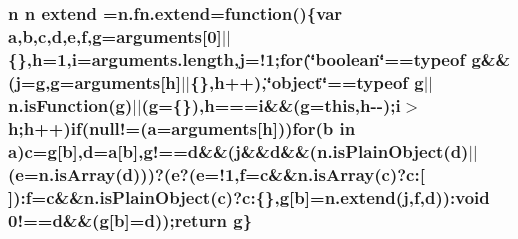 \subsubsection[{\texorpdfstring{extend}{extend}}]{\setlength{\rightskip}{0pt plus 5cm}n n extend =n.\+fn.\+extend=function()\{var {\bf a},{\bf b},{\bf c},{\bf d},{\bf e},{\bf f},{\bf g}=arguments\mbox{[}0\mbox{]}$\vert$$\vert$\{\},{\bf h}=1,{\bf i}={\bf arguments.\+length},{\bf j}=!1;{\bf for}(\char`\"{}boolean\char`\"{}==typeof {\bf g}\&\&({\bf j}={\bf g},{\bf g}=arguments\mbox{[}{\bf h}\mbox{]}$\vert$$\vert$\{\},{\bf h}++),\char`\"{}object\char`\"{}==typeof {\bf g}$\vert$$\vert${\bf n.\+is\+Function}({\bf g})$\vert$$\vert$({\bf g}=\{\}),{\bf h}==={\bf i}\&\&({\bf g}=this,{\bf h}-\/-\/);{\bf i}$>${\bf h};{\bf h}++){\bf if}(null!=({\bf a}=arguments\mbox{[}{\bf h}\mbox{]})){\bf for}({\bf b} in {\bf a}){\bf c}={\bf g}\mbox{[}{\bf b}\mbox{]},{\bf d}={\bf a}\mbox{[}{\bf b}\mbox{]},g!=={\bf d}\&\&({\bf j}\&\&{\bf d}\&\&({\bf n.\+is\+Plain\+Object}({\bf d})$\vert$$\vert$({\bf e}={\bf n.\+is\+Array}({\bf d})))?({\bf e}?({\bf e}=!1,{\bf f}={\bf c}\&\&{\bf n.\+is\+Array}({\bf c})?c\+:\mbox{[}$\,$\mbox{]})\+:{\bf f}={\bf c}\&\&{\bf n.\+is\+Plain\+Object}({\bf c})?c\+:\{\},{\bf g}\mbox{[}{\bf b}\mbox{]}=n.\+extend({\bf j},{\bf f},{\bf d}))\+:void 0!=={\bf d}\&\&({\bf g}\mbox{[}{\bf b}\mbox{]}={\bf d}));return {\bf g}\}}\hypertarget{jquery-2_82_80_8min_8js_a95a6433c7ca35778b94dc2489f6838c9}{}\label{jquery-2_82_80_8min_8js_a95a6433c7ca35778b94dc2489f6838c9}
